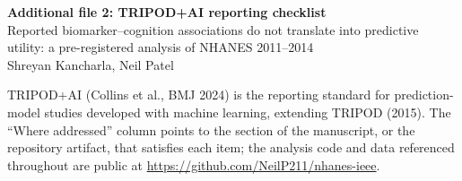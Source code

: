 \documentclass[10pt]{article}
\title{}
\date{}
\begin{document}
\begin{center}
{\large\bfseries Additional file 2: TRIPOD+AI reporting checklist}\\[2pt]
{\small Reported biomarker--cognition associations do not translate into predictive utility: a pre-registered analysis of NHANES 2011--2014}\\[2pt]
{\small Shreyan Kancharla, Neil Patel}
\end{center}

\bigskip

TRIPOD+AI (Collins et al., BMJ 2024) is the reporting standard for prediction-model studies developed with machine learning, extending TRIPOD (2015). The ``Where addressed'' column points to the section of the manuscript, or the repository artifact, that satisfies each item; the analysis code and data referenced throughout are public at \url{https://github.com/NeilP211/nhanes-ieee}.

\footnotesize
\end{document}
